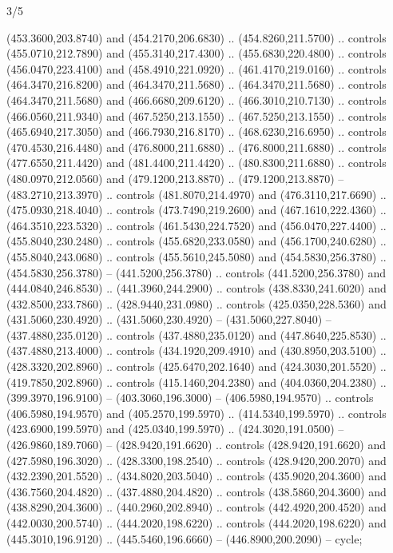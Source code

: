 \begin{flagdescription}{3/5}
\begin{scope}[shift={(0.5\flaglength,0.5\flagwidth)},scale=\flagwidth/510]
\begin{scope}[y=0.80pt, x=0.80pt, yscale=-1.06, xscale=1.06,yshift=-240pt,xshift=-400pt]
\begin{scope}[cm={{0.83333,0.0,0.0,0.83333,(154.64672,48.64761)}}]
\begin{scope}[cm={{0.93334,0.0,0.0,0.93334,(-4.86471,22.64035)}}]
\begin{scope}[line width=0.489\lw]
\begin{scope}[draw=black,fill=cd67c59]
  (453.3600,203.8740) and (454.2170,206.6830) .. (454.8260,211.5700) .. controls
  (455.0710,212.7890) and (455.3140,217.4300) .. (455.6830,220.4800) .. controls
  (456.0470,223.4100) and (458.4910,221.0920) .. (461.4170,219.0160) .. controls
  (464.3470,216.8200) and (464.3470,211.5680) .. (464.3470,211.5680) .. controls
  (464.3470,211.5680) and (466.6680,209.6120) .. (466.3010,210.7130) .. controls
  (466.0560,211.9340) and (467.5250,213.1550) .. (467.5250,213.1550) .. controls
  (465.6940,217.3050) and (466.7930,216.8170) .. (468.6230,216.6950) .. controls
  (470.4530,216.4480) and (476.8000,211.6880) .. (476.8000,211.6880) .. controls
  (477.6550,211.4420) and (481.4400,211.4420) .. (480.8300,211.6880) .. controls
  (480.0970,212.0560) and (479.1200,213.8870) .. (479.1200,213.8870) --
  (483.2710,213.3970) .. controls (481.8070,214.4970) and (476.3110,217.6690) ..
  (475.0930,218.4040) .. controls (473.7490,219.2600) and (467.1610,222.4360) ..
  (464.3510,223.5320) .. controls (461.5430,224.7520) and (456.0470,227.4400) ..
  (455.8040,230.2480) .. controls (455.6820,233.0580) and (456.1700,240.6280) ..
  (455.8040,243.0680) .. controls (455.5610,245.5080) and (454.5830,256.3780) ..
  (454.5830,256.3780) -- (441.5200,256.3780) .. controls (441.5200,256.3780) and
  (444.0840,246.8530) .. (441.3960,244.2900) .. controls (438.8330,241.6020) and
  (432.8500,233.7860) .. (428.9440,231.0980) .. controls (425.0350,228.5360) and
  (431.5060,230.4920) .. (431.5060,230.4920) -- (431.5060,227.8040) --
  (437.4880,235.0120) .. controls (437.4880,235.0120) and (447.8640,225.8530) ..
  (437.4880,213.4000) .. controls (434.1920,209.4910) and (430.8950,203.5100) ..
  (428.3320,202.8960) .. controls (425.6470,202.1640) and (424.3030,201.5520) ..
  (419.7850,202.8960) .. controls (415.1460,204.2380) and (404.0360,204.2380) ..
  (399.3970,196.9100) -- (403.3060,196.3000) -- (406.5980,194.9570) .. controls
  (406.5980,194.9570) and (405.2570,199.5970) .. (414.5340,199.5970) .. controls
  (423.6900,199.5970) and (425.0340,199.5970) .. (424.3020,191.0500) --
  (426.9860,189.7060) -- (428.9420,191.6620) .. controls (428.9420,191.6620) and
  (427.5980,196.3020) .. (428.3300,198.2540) .. controls (428.9420,200.2070) and
  (432.2390,201.5520) .. (434.8020,203.5040) .. controls (435.9020,204.3600) and
  (436.7560,204.4820) .. (437.4880,204.4820) .. controls (438.5860,204.3600) and
  (438.8290,204.3600) .. (440.2960,202.8940) .. controls (442.4920,200.4520) and
  (442.0030,200.5740) .. (444.2020,198.6220) .. controls (444.2020,198.6220) and
  (445.3010,196.9120) .. (445.5460,196.6660) -- (446.8900,200.2090) -- cycle;

\end{scope}
\end{scope}
\end{scope}
\end{scope}
\end{scope}
\end{scope}
\end{flagdescription}
